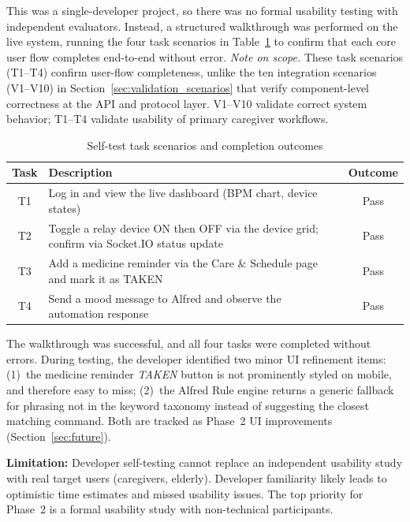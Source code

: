 This was a single-developer project, so there was no formal usability testing with independent evaluators. Instead, a structured walkthrough was performed on the live system, running the four task scenarios in Table~\ref{tab:eval_tasks} to confirm that each core user flow completes end-to-end without error. \textit{Note on scope.} These task scenarios (T1--T4) confirm user-flow completeness, unlike the ten integration scenarios (V1--V10) in Section~\ref{sec:validation_scenarios} that verify component-level correctness at the API and protocol layer. V1--V10 validate correct system behavior; T1--T4 validate usability of primary caregiver workflows.
\begin{table}[H]
\centering
\caption{Self-test task scenarios and completion outcomes}
\label{tab:eval_tasks}
\small
\begin{tabularx}{\textwidth}{@{} c >{\RaggedRight\arraybackslash}X c @{}}
\toprule
\textbf{Task} & \textbf{Description} & \textbf{Outcome} \\
\midrule
T1 & Log in and view the live dashboard (BPM chart, device states)
   & Pass \\
T2 & Toggle a relay device ON then OFF via the device grid; confirm via Socket.IO status update
   & Pass \\
T3 & Add a medicine reminder via the Care \& Schedule page and mark it as TAKEN
   & Pass \\
T4 & Send a mood message to Alfred and observe the automation response
   & Pass \\
\bottomrule
\end{tabularx}
\end{table}

The walkthrough was successful, and all four tasks were completed without errors. During testing, the developer identified two minor UI refinement items: (1)~the medicine reminder \textit{TAKEN} button is not prominently styled on mobile, and therefore easy to miss; (2)~the Alfred Rule engine returns a generic fallback for phrasing not in the keyword taxonomy instead of suggesting the closest matching command. Both are tracked as Phase~2 UI improvements (Section~\ref{sec:future}).

\textbf{Limitation:} Developer self-testing cannot replace an independent usability study with real target users (caregivers, elderly). Developer familiarity likely leads to optimistic time estimates and missed usability issues. The top priority for Phase~2 is a formal usability study with non-technical participants.
